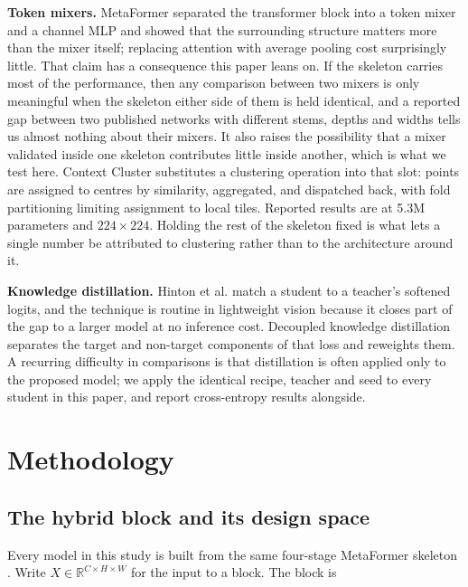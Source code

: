 \textbf{Token mixers.} MetaFormer \cite{metaformer} separated the transformer
block into a token mixer and a channel MLP and showed that the surrounding
structure matters more than the mixer itself; replacing attention with average
pooling cost surprisingly little. That claim has a consequence this paper
leans on. If the skeleton carries most of the performance, then any comparison
between two mixers is only meaningful when the skeleton either side of them is
held identical, and a reported gap between two published networks with
different stems, depths and widths tells us almost nothing about their mixers.
It also raises the possibility that a mixer validated inside one skeleton
contributes little inside another, which is what we test here. Context Cluster
\cite{coc} substitutes a clustering operation into that slot: points are
assigned to centres by similarity, aggregated, and dispatched back, with fold
partitioning limiting assignment to local tiles. Reported results are at 5.3M
parameters and $224\times224$. Holding the rest of the skeleton fixed is what
lets a single number be attributed to clustering rather than to the
architecture around it.

\textbf{Knowledge distillation.} Hinton et al. \cite{hinton} match a student
to a teacher's softened logits, and the technique is routine in lightweight
vision because it closes part of the gap to a larger model at no inference
cost. Decoupled knowledge distillation \cite{dkd} separates the target and
non-target components of that loss and reweights them. A recurring difficulty
in comparisons is that distillation is often applied only to the proposed
model; we apply the identical recipe, teacher and seed to every student in
this paper, and report cross-entropy results alongside.

\section{Methodology}
\label{sec:method}

\subsection{The hybrid block and its design space}

Every model in this study is built from the same four-stage MetaFormer
skeleton \cite{metaformer}. Write $X \in \mathbb{R}^{C \times H \times W}$ for
the input to a block. The block is

